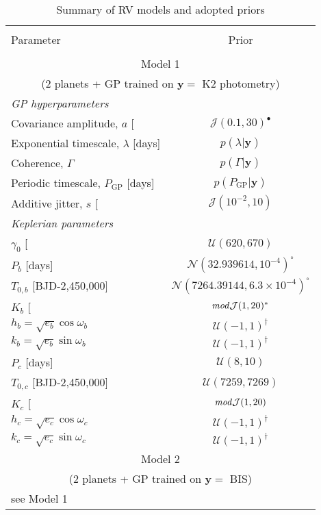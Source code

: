 \begin{table}
\small
\renewcommand{\arraystretch}{0.7}
\centering
\caption[]{Summary of RV models and adopted priors}
\label{k218table:models}
\begin{tabular}{lc}
\hline \\ [-1ex]
Parameter & Prior \smallskip \\
\hline \\ [-1ex]
\multicolumn{2}{c}{Model 1} \\
\multicolumn{2}{c}{(2 planets + GP trained on $\mathbf{y}=$ K2 photometry)} \smallskip \\
\emph{GP hyperparameters} & \\
Covariance amplitude, $a$ [\mps{]} & $\mathcal{J}(0.1,30)^{\bullet}$ \\
Exponential timescale, $\lambda$ [days] & $p(\lambda|\mathbf{y})$ \\
Coherence, $\Gamma$ &  $p(\Gamma|\mathbf{y})$ \\
Periodic timescale, $P_{\text{GP}}$ [days] &  $p(P_{\text{GP}}|\mathbf{y})$ \\
Additive jitter, $s$ [\mps{]} & $\mathcal{J}(10^{-2},10)$ \smallskip \\ 
\emph{Keplerian parameters} & \\
$\gamma_0$ [\mps{]} & $\mathcal{U}(620,670)$ \\
$P_b$ [days] & $\mathcal{N}(32.939614,10^{-4})^{\circ}$ \\
$T_{0,b}$ [BJD-2,450,000] & $\mathcal{N}(7264.39144,6.3 \times 10^{-4})^{\circ}$ \\
$K_b$ [\mps{]} & $\text{\emph{mod}}\mathcal{J}(1,20)^{\ast}$ \\
$h_b = \sqrt{e_b}\cos{\omega_b}$ & $\mathcal{U}(-1,1)^{\dagger}$ \\
$k_b = \sqrt{e_b}\sin{\omega_b}$ & $\mathcal{U}(-1,1)^{\dagger}$ \\
$P_c$ [days] & $\mathcal{U}(8,10)$ \\
$T_{0,c}$ [BJD-2,450,000] & $\mathcal{U}(7259,7269)$ \\
$K_c$ [\mps{]} & $\text{\emph{mod}}\mathcal{J}(1,20)$ \\
$h_c = \sqrt{e_c}\cos{\omega_c}$ & $\mathcal{U}(-1,1)^{\dagger}$ \\
$k_c = \sqrt{e_c}\sin{\omega_c}$ & $\mathcal{U}(-1,1)^{\dagger}$ \medskip \\

\multicolumn{2}{c}{Model 2} \\
\multicolumn{2}{c}{(2 planets + GP trained on $\mathbf{y}=$ BIS)} \smallskip \\
see Model 1 & \\


\end{tabular}
\end{table}
